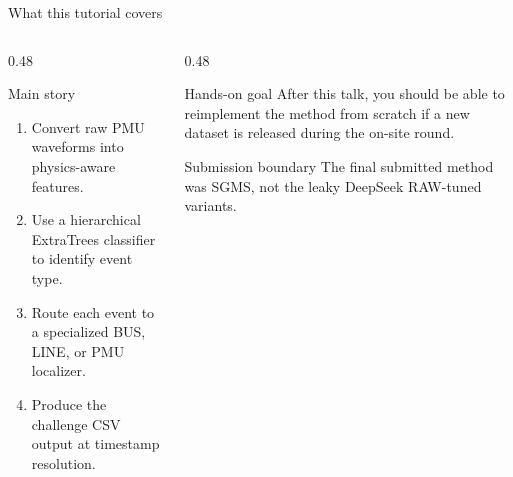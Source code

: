 \documentclass[10pt,aspectratio=169]{beamer}
\begin{document}
\begin{frame}{What this tutorial covers}
\small
\begin{columns}[T,totalwidth=\textwidth]
\begin{column}{0.48\textwidth}
\begin{block}{Main story}
\begin{enumerate}
  \item Convert raw PMU waveforms into physics-aware features.
  \item Use a hierarchical ExtraTrees classifier to identify event type.
  \item Route each event to a specialized BUS, LINE, or PMU localizer.
  \item Produce the challenge CSV output at timestamp resolution.
\end{enumerate}
\end{block}
\end{column}
\begin{column}{0.48\textwidth}
\begin{exampleblock}{Hands-on goal}
After this talk, you should be able to reimplement the method from scratch if a new dataset is released during the on-site round.
\end{exampleblock}
\begin{alertblock}{Submission boundary}
The final submitted method was SGMS, not the leaky DeepSeek RAW-tuned variants.
\end{alertblock}
\end{column}
\end{columns}
\end{frame}
\end{document}
